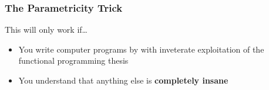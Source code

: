 \begin{frame}[fragile]
\frametitle{The Parametricity Trick}
\begin{block}{This will only work if\ldots}
\begin{itemize}
\item You write computer programs by with inveterate exploitation of the functional programming thesis
\item You understand that anything else is \textbf{completely insane}
\end{itemize}
\end{block}
\end{frame}
